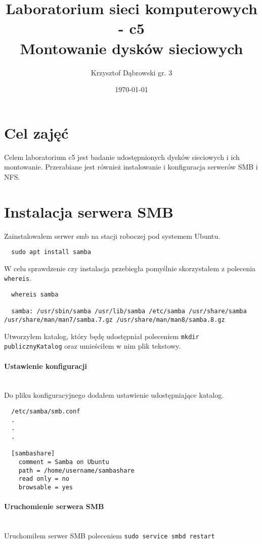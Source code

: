 \documentclass{article} %
\title{Laboratorium sieci komputerowych - c5 \\ Montowanie dysków sieciowych}
\author{Krzysztof Dąbrowski gr. 3}
\date{\today}
\begin{document}
\maketitle{}
\tableofcontents{}

\section{Cel zajęć}
Celem laboratorium c5 jest badanie udostępnionych dysków sieciowych i ich montowanie.
Przerabiane jest również instalowanie i konfiguracja serwerów SMB i NFS.

\section{Instalacja serwera SMB}
Zainstalowałem serwer smb na stacji roboczej pod systemem Ubuntu.

\begin{verbatim}
  sudo apt install samba
\end{verbatim}

W celu sprawdzenie czy instalacja przebiegła pomyślnie skorzystałem z polecenia \texttt{whereis}.
\begin{verbatim}
  whereis samba

  samba: /usr/sbin/samba /usr/lib/samba /etc/samba /usr/share/samba /usr/share/man/man7/samba.7.gz /usr/share/man/man8/samba.8.gz
\end{verbatim}

Utworzyłem katalog, który będę udostępniał poleceniem \texttt{mkdir publicznyKatalog} oraz umieściłem w nim plik tekstowy.

\paragraph{Ustawienie konfiguracji} \mbox{} \\
Do pliku konfiguracyjnego dodałem ustawienie udostępniające katalog.

\begin{verbatim}
  /etc/samba/smb.conf
  .
  .
  .

  [sambashare]
    comment = Samba on Ubuntu
    path = /home/username/sambashare
    read only = no
    browsable = yes
\end{verbatim}

\paragraph{Uruchomienie serwera SMB} \mbox{} \\
Uruchomiłem serwer SMB poleceniem \texttt{sudo service smbd restart}
\end{document}
